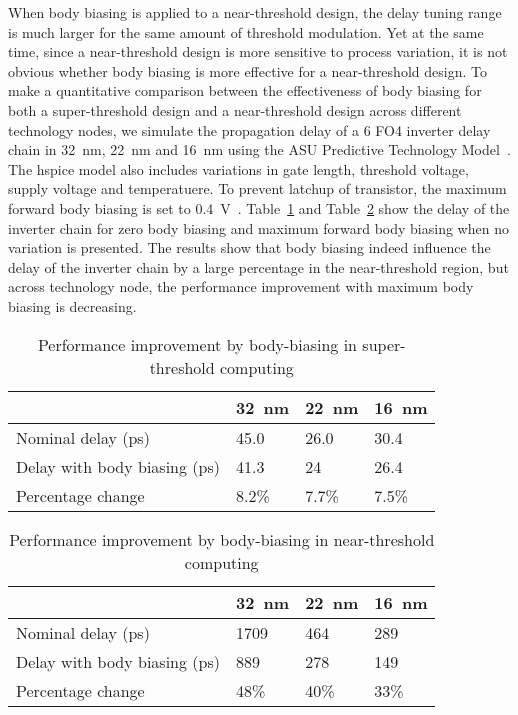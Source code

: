 When body biasing is applied to a near-threshold design, the delay tuning range is much larger for the same amount of threshold modulation.
Yet at the same time, since a near-threshold design is more sensitive to process variation, it is not obvious whether body biasing is more effective for a near-threshold design.
To make a quantitative comparison between the effectiveness of body biasing for both a super-threshold design and a near-threshold design across different technology nodes, we simulate the propagation delay of a 6 FO4 inverter delay chain in \SI{32}{\nano\meter}, \SI{22}{\nano\meter} and \SI{16}{\nano\meter} using the ASU Predictive Technology Model~\cite{PredictiveModel}.
The hspice model also includes variations in gate length, threshold voltage, supply voltage and temperatuere. To prevent latchup of transistor,  the maximum forward body biasing is set to \SI{0.4}{\volt}~\cite{BodyBiasing}.
Table~\ref{tbl:body1} and Table~\ref{tbl:body2} show the delay of the inverter chain for zero body biasing and maximum forward body biasing when no variation is presented.
The results show that body biasing indeed influence the delay of the inverter chain by a large percentage in the near-threshold region, but across technology node, the performance improvement with maximum body biasing is decreasing.

\begin{table}
  \caption{Performance improvement by body-biasing in super-threshold computing} 
  \centering 
  \label{tbl:body1}
  \begin{tabular}{ | l | l | l | l | }
    \hline
    & \SI{32}{\nano\meter} & \SI{22}{\nano\meter} & \SI{16}{\nano\meter} \\ \hline
    Nominal delay (ps) & 45.0 & 26.0 & 30.4 \\ \hline
    Delay with body biasing (ps)  & 41.3 & 24 & 26.4 \\  \hline
    Percentage change  & 8.2\% & 7.7\% & 7.5\% \\ 
    \hline
  \end{tabular}
\end{table}



\begin{table}
  \caption {Performance improvement by body-biasing in near-threshold computing}  
  \centering
  \label{tbl:body2}
  \begin{tabular}{ | l | l | l | l | }
    \hline
    & \SI{32}{\nano\meter} & \SI{22}{\nano\meter} & \SI{16}{\nano\meter} \\ \hline
    Nominal delay (ps) & 1709 & 464 & 289 \\ \hline
    Delay with body biasing (ps)  & 889 & 278 & 149 \\  \hline
    Percentage change  & 48\% & 40\% & 33\% \\ 
    \hline
  \end{tabular}
\end{table}


